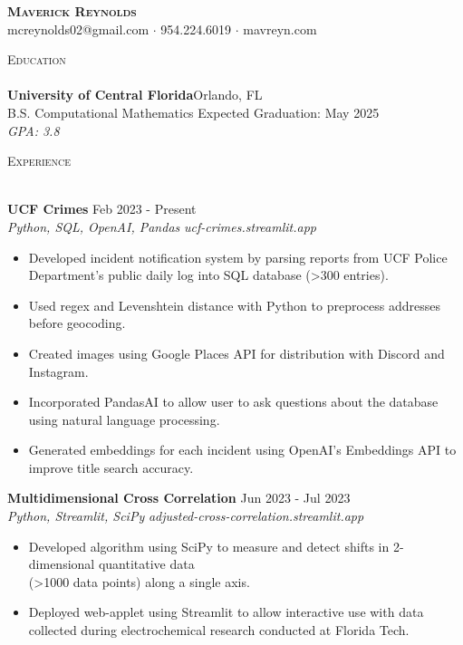 \documentclass[letterpaper]{article}
\newcommand{\lineunder} {
    \vspace*{-8pt} \\
    \hspace*{-18pt} \hrulefill \\
}
\newcommand{\header} [1] {
    {\hspace*{-18pt}\vspace*{12pt} \large\textsc{#1}}
    \vspace*{-12pt} \lineunder
}
\begin{document}
\vspace*{-25pt}
    

\vspace*{-10pt}
\begin{center}
	{\Huge \scshape \textbf {Maverick Reynolds}}\\
	mcreynolds02@gmail.com $\cdot$ 954.224.6019 $\cdot$ mavreyn.com\\
\end{center}


\header{Education}
\textbf{University of Central Florida}\hfill Orlando, FL\\
B.S. Computational Mathematics \hfill Expected Graduation: May 2025\\
\hspace{7mm} \textit{GPA: 3.8}\\
\vspace{3mm}


\header{Experience}
\vspace{1mm}

\textbf{UCF Crimes} \hfill Feb 2023 - Present \\
\textit{Python, SQL, OpenAI, Pandas} \hfill \textit{ucf-crimes.streamlit.app}\\
\vspace{-1mm}
\begin{itemize} \itemsep 1pt
	\item Developed incident notification system by parsing reports from UCF Police Department's public daily log into SQL database (>300 entries).
	\item Used regex and Levenshtein distance with Python to preprocess addresses before geocoding.
	\item Created images using Google Places API for distribution with Discord and Instagram.
	\item Incorporated PandasAI to allow user to ask questions about the database using natural language processing.
	\item Generated embeddings for each incident using OpenAI's Embeddings API to improve title search accuracy.
\end{itemize}

\textbf{Multidimensional Cross Correlation} \hfill Jun 2023 - Jul 2023 \\
\textit{Python, Streamlit, SciPy} \hfill \textit{adjusted-cross-correlation.streamlit.app}\\
\vspace{-1mm}
\begin{itemize} \itemsep 1pt
	\item Developed algorithm using SciPy to measure and detect shifts in 2-dimensional quantitative data \\ (>1000 data points) along a single axis.
	\item Deployed web-applet using Streamlit to allow interactive use with data collected during electrochemical research conducted at Florida Tech.
\end{itemize}
\end{document}
